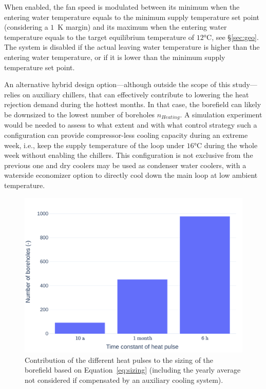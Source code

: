 When enabled, the fan speed is modulated between its minimum when the entering water temperature equals to the minimum supply temperature set point (considering a $1$~K margin) and its maximum when the entering water temperature equals to the target equilibrium temperature of $12$°C, see §\ref{sec:geo}.
The system is disabled if the actual leaving water temperature is higher than the entering water temperature, or if it is lower than the minimum supply temperature set point.

An alternative hybrid design option---although outside the scope of this study---relies on auxiliary chillers, that can effectively contribute to lowering the heat rejection demand during the hottest months. In that case, the borefield can likely be downsized to the lowest number of boreholes $n_{Heating}$. A simulation experiment would be needed to assess to what extent and with what control strategy such a configuration can provide compressor-less cooling capacity during an extreme week, i.e., keep the supply temperature of the loop under $16$°C during the whole week without enabling the chillers. This configuration is not exclusive from the previous one and dry coolers may be used as condenser water coolers, with a waterside economizer option to directly cool down the main loop at low ambient temperature.

\begin{figure}[!htbp]
    \centering
    \includegraphics[width=.6\linewidth]{../python_scripts/figures/ContributionL.pdf}
    \caption{Contribution of the different heat pulses to the sizing of the borefield based on  Equation~\ref{eq:sizing} (including the yearly average not considered if compensated by an auxiliary cooling system).}
    \label{fig:contribution_to_L}
\end{figure}

